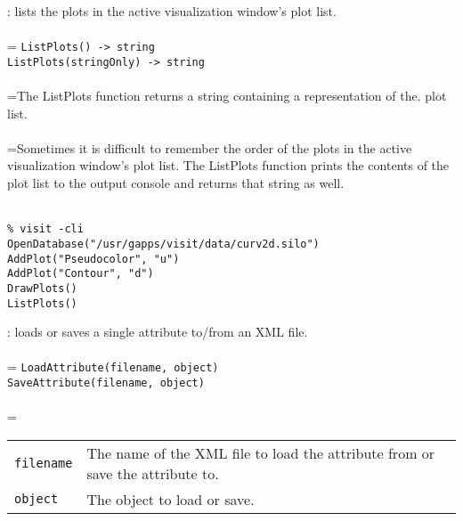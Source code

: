 \documentclass[10pt,a4paper]{report}
\begin{document}
{}
: lists the plots in the active visualization window's plot list.\\[-3mm]

 \\ 
\hangindent=\parindent 
\verb!ListPlots() -> string!\\ 
\verb!ListPlots(stringOnly) -> string!\\ [-3mm]

 \\ 
\hangindent=\parindent The ListPlots function returns a string containing a representation of the. plot list. \\[-3mm] 

 \\ 
\hangindent=\parindent Sometimes it is difficult to remember the order of the plots in the active visualization window's plot list. The ListPlots function prints the contents of the plot list to the output console and returns that string as well. \\[-3mm] 

\\[-6mm]
\begin{verbatim}% visit -cli
OpenDatabase("/usr/gapps/visit/data/curv2d.silo")
AddPlot("Pseudocolor", "u")
AddPlot("Contour", "d")
DrawPlots()
ListPlots()
\end{verbatim}
\newpage


{}
: loads or saves a single attribute to/from an XML file.\\[-3mm]

 \\ 
\hangindent=\parindent 
\verb!LoadAttribute(filename, object)!\\ 
\verb!SaveAttribute(filename, object)!\\ [-3mm]

 \\ 
\hangindent=\parindent 
\begin{tabular}{lp{9cm}}
\verb!filename! & The name of the XML file to load the attribute from or save the attribute to. \\
\verb!object! & The object to load or save. \\
\end{tabular} \\[-2mm]
\end{document}
